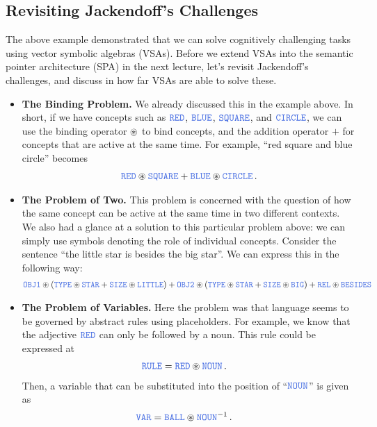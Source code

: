 \documentclass[10pt,letterpaper,oneside]{article}
\begin{document}
\subsection{Revisiting Jackendoff's Challenges}

The above example demonstrated that we can solve cognitively challenging tasks using vector symbolic algebras (VSAs). Before we extend VSAs into the semantic pointer architecture (SPA) in the next lecture, let's revisit Jackendoff's challenges, and discuss in how far VSAs are able to solve these.

\begin{itemize}
	\item \textbf{The Binding Problem.} We already discussed this in the example above. In short, if we have concepts such as $\Obj{RED}$, $\Obj{BLUE}$, $\Obj{SQUARE}$, and $\Obj{CIRCLE}$, we can use the binding operator $\circledast$ to bind concepts, and the addition operator $+$ for concepts that are active at the same time. For example, \enquote{red square and blue circle} becomes
	\begin{align*}
		\Obj{RED} \CC \Obj{SQUARE} + \Obj{BLUE} \CC \Obj{CIRCLE} \,.
	\end{align*}
	\item \textbf{The Problem of Two.} This problem is concerned with the question of how the same concept can be active at the same time in two different contexts. We also had a glance at a solution to this particular problem above: we can simply use symbols denoting the role of individual concepts. Consider the sentence \enquote{the little star is besides the big star}. We can express this in the following way:
	\begin{align*}
		\Obj{OBJ1} \CC (\Obj{TYPE} \CC \Obj{STAR} + \Obj{SIZE} \CC \Obj{LITTLE}) + \Obj{OBJ2} \CC (\Obj{TYPE} \CC \Obj{STAR} + \Obj{SIZE} \CC \Obj{BIG}) + \Obj{REL} \CC \Obj{BESIDES}
	\end{align*}
	\item \textbf{The Problem of Variables.} Here the problem was that language seems to be governed by abstract rules using placeholders. For example, we know that the adjective $\Obj{RED}$ can only be followed by a noun. This rule could be expressed at
	\begin{align*}
		\Obj{RULE} &= \Obj{RED} \CC \Obj{NOUN} \,.
	\end{align*}
	Then, a variable that can be substituted into the position of \enquote{$\Obj{NOUN}$} is given as
	\begin{align*}
		\Obj{VAR} &= \Obj{BALL} \CC \Obj{NOUN}^{-1} \,.

\end{align*}
\end{itemize}
\end{document}
